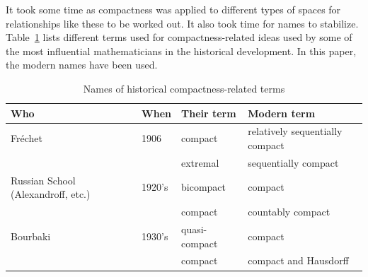 \documentclass[12pt]{article}
\begin{document}
It took some time as compactness was applied to different types of spaces for
relationships like these to be worked out. It also took time for names to stabilize. Table~\ref{t:compactnames} lists different terms used for compactness-related ideas used by some of the most influential mathematicians in the historical development.
In this paper, the modern names have been used.

\pagebreak
\begin{table}[h]
\centering
\begin{tabular}{|p{1.1 in}|p{0.45 in}|p{0.9 in}|p{1.35 in}|}
\hline

\bf{Who} & \bf{When}  & \bf{Their term}  & \bf{Modern
term}\\

\hline Fr\'{e}chet   & 1906       & compact    & relatively sequentially compact\\
\cline{3-4}
              &            & extremal         & sequentially compact\\ \hline
Russian School \newline (Alexandroff, etc.)  & 1920's  & bicompact  & compact\\
\cline{3-4}
              &            & compact         & countably \newline compact\\
\hline          Bourbaki      & 1930's     & quasi-compact  & compact\\ \cline{3-4}
              &            & compact         & compact and \newline Hausdorff\\
\hline      

\end{tabular}
\caption{Names of historical compactness-related terms}
\label{t:compactnames}
\end{table}

\end{document}
